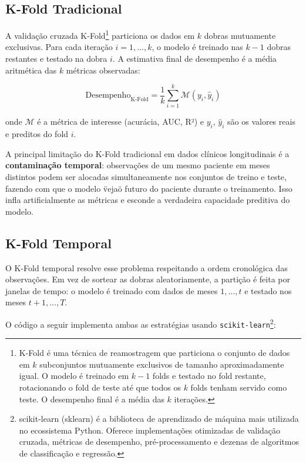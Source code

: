 \subsection{K-Fold Tradicional}

A validação cruzada K-Fold\footnote{K-Fold é uma técnica de
reamostragem que particiona o conjunto de dados em $k$ subconjuntos
mutuamente exclusivos de tamanho aproximadamente igual. O modelo é
treinado em $k-1$ folds e testado no fold restante, rotacionando o
fold de teste até que todos os $k$ folds tenham servido como teste. O
desempenho final é a média das $k$ iterações.}
particiona os dados em $k$ dobras mutuamente exclusivas. Para cada
iteração $i = 1, \dots, k$, o modelo é treinado nas $k-1$ dobras
restantes e testado na dobra $i$. A estimativa final de desempenho é
a média aritmética das $k$ métricas observadas:

\begin{equation}
    \text{Desempenho}_{\text{K-Fold}} = \frac{1}{k} \sum_{i=1}^{k} \mathcal{M}(y_i, \hat{y}_i)
    \label{eq:kfold_media}
\end{equation}

onde $\mathcal{M}$ é a métrica de interesse (acurácia, AUC, R²) e
$y_i$, $\hat{y}_i$ são os valores reais e preditos do fold $i$.

A principal limitação do K-Fold tradicional em dados clínicos
longitudinais é a \textbf{contaminação temporal}: observações de um
mesmo paciente em meses distintos podem ser alocadas simultaneamente
nos conjuntos de treino e teste, fazendo com que o modelo \"veja\" o
futuro do paciente durante o treinamento. Isso infla
artificialmente as métricas e esconde a verdadeira capacidade
preditiva do modelo.

\subsection{K-Fold Temporal}

O K-Fold temporal resolve esse problema respeitando a ordem
cronológica das observações. Em vez de sortear as dobras
aleatoriamente, a partição é feita por janelas de tempo: o modelo é
treinado com dados de meses $1, \dots, t$ e testado nos meses
$t+1, \dots, T$.

O código a seguir implementa ambas as estratégias usando
\texttt{scikit-learn}\footnote{scikit-learn (sklearn) é a biblioteca
de aprendizado de máquina mais utilizada no ecossistema Python.
Oferece implementações otimizadas de validação cruzada, métricas de
desempenho, pré-processamento e dezenas de algoritmos de
classificação e regressão.}:

